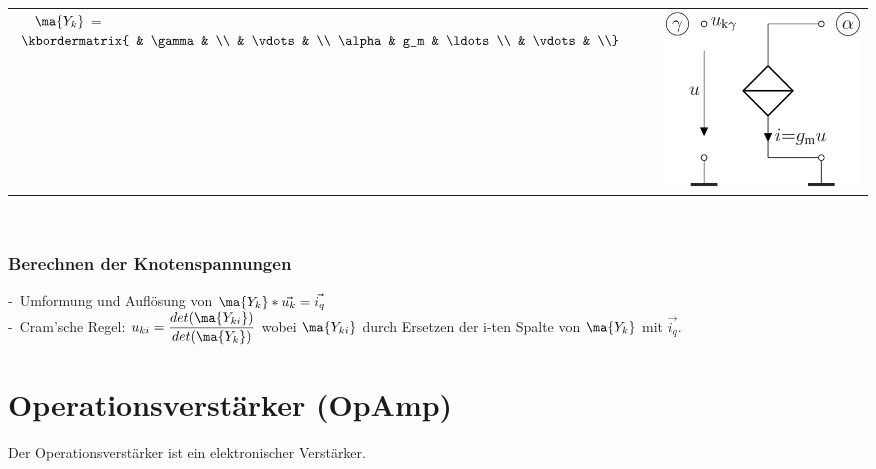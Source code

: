 \documentclass[fs, footer]{latex4ei}
\begin{document}
\begin{multicols*}{4}
\begin{tabular}{ll}
		 $\ \ \ \ \ma {Y_k}$ =
		$\kbordermatrix{ & \gamma & \\
		& \vdots & \\
		\alpha & g_m & \ldots \\
		& \vdots & \\}$ & \parbox{3cm}{\includegraphics[scale=0.15]{./img/nodevoltageanalysis/vccs_a_y_gnd.png} }\\

	\end{tabular}\\
	\normalsize
	\subsubsection{Berechnen der Knotenspannungen}
	-\ Umformung und Auflösung von $\ma {Y_k} * \vec{u_k} = \vec{i_q}$\\
	-\ Cram'sche Regel: $u_{ki} = \frac{det(\ma {Y_{ki}})}{det(\ma{Y_k})}$ wobei $\ma {Y_{ki}}$ durch Ersetzen der i-ten Spalte von $\ma {Y_k}$ mit $\vec{i_q}$.\\


\section{Operationsverstärker (OpAmp)}
	Der Operationsverstärker ist ein elektronischer Verstärker.


\end{multicols*}
\end{document}
